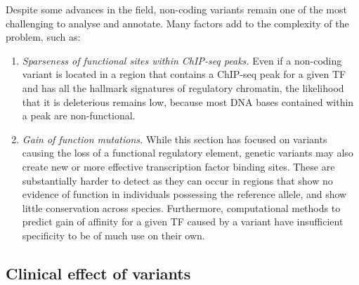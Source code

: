Despite some advances in the field, non-coding variants remain one of the most challenging to analyse and annotate. 
Many factors add to the complexity of the problem, such as:

\begin{enumerate}[label=\roman*]
	
	\item \textit{Sparseness of functional sites within ChIP-seq peaks.} Even if a non-coding variant is located in a region that contains a ChIP-seq peak for a given TF and has all the hallmark signatures of regulatory chromatin, the likelihood that it is deleterious remains low, because most DNA bases contained within a peak are non-functional. 
	
	\item \textit{Gain of function mutations.} While this section has focused on variants causing the loss of a functional regulatory element, genetic variants may also create new or more effective transcription factor binding sites. These are substantially harder to detect as they can occur in regions that show no evidence of function in individuals possessing the reference allele, and show little conservation across species. Furthermore, computational methods to predict gain of affinity for a given TF caused by a variant have insufficient specificity to be of much use on their own. 
	
\end{enumerate}

\subsection{Clinical effect of variants}

